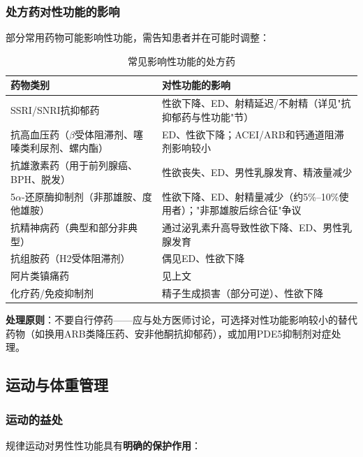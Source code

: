 \subsubsection{处方药对性功能的影响}

部分常用药物可能影响性功能，需告知患者并在可能时调整：

\begin{table}[htbp]
\centering
\caption{常见影响性功能的处方药}
\label{tab:drug_sexual_effects}
\begin{tabularx}{\textwidth}{@{}lX@{}}
    \toprule
    \textbf{药物类别} & \textbf{对性功能的影响} \\
    \midrule
    SSRI/SNRI抗抑郁药 & 性欲下降、ED、射精延迟/不射精（详见"抗抑郁药与性功能"节） \\
    抗高血压药（$\beta$受体阻滞剂、噻嗪类利尿剂、螺内酯） & ED、性欲下降；ACEI/ARB和钙通道阻滞剂影响较小 \\
    抗雄激素药（用于前列腺癌、BPH、脱发） & 性欲丧失、ED、男性乳腺发育、精液量减少 \\
    5$\alpha$-还原酶抑制剂（非那雄胺、度他雄胺） & 性欲下降、ED、射精量减少（约5\%--10\%使用者）；"非那雄胺后综合征"争议 \\
    抗精神病药（典型和部分非典型） & 通过泌乳素升高导致性欲下降、ED、男性乳腺发育 \\
    抗组胺药（H2受体阻滞剂） & 偶见ED、性欲下降 \\
    阿片类镇痛药 & 见上文 \\
    化疗药/免疫抑制剂 & 精子生成损害（部分可逆）、性欲下降 \\
    \bottomrule
\end{tabularx}
\end{table}

\textbf{处理原则}：不要自行停药——应与处方医师讨论，可选择对性功能影响较小的替代药物（如换用ARB类降压药、安非他酮抗抑郁药），或加用PDE5抑制剂对症处理。

\subsection{运动与体重管理}

\subsubsection{运动的益处}

规律运动对男性性功能具有\textbf{明确的保护作用}：

